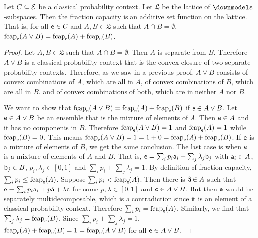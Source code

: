 	\begin{prop}
		Let $C \subseteq \Ens$ be a classical probability context. Let $\mathfrak{L}$ be the lattice of $\separate$-subspaces. Then the fraction capacity is an additive set function on the lattice. That is, for all $\ens \in C$ and $A, B \in \mathfrak{L}$ such that $A \cap B = \emptyset$,  $\fcap_{\ens}(A \vee B) = \fcap_{\ens}(A) + \fcap_{\ens}(B)$.
	\end{prop}
	
	\begin{proof}
		Let $A, B\in \mathfrak{L}$ such that $A \cap B = \emptyset$. Then $A$ is separate from $B$. Therefore $A \vee B$ is a classical probability context that is the convex closure of two separate probability contexts. Therefore, as we saw in a previous proof, $A \vee B$ consists of convex combinations of $A$, which are all in $A$, of convex combinations of $B$, which are all in $B$, and of convex combinations of both, which are in neither $A$ nor $B$.
		
		We want to show that $\fcap_{\ens}(A \vee B) = \fcap_{\ens}(A) + \fcap_{\ens}(B)$ if $\ens \in A \vee B$. Let $\ens \in A \vee B$ be an ensemble that is the mixture of elements of $A$. Then $\ens \in A$ and it has no components in $B$. Therefore $\fcap_{\ens}(A \vee B) = 1$ and $\fcap_{\ens}(A) = 1$ while $\fcap_{\ens}(B) = 0$. This means $\fcap_{\ens}(A \vee B) = 1 = 1 + 0 = \fcap_{\ens}(A) + \fcap_{\ens}(B)$. If $\ens$ is a mixture of elements of $B$, we get the same conclusion. The last case is when $\ens$ is a mixture of elements of $A$ and $B$. That is, $\ens = \sum_i p_i \ens[a]_i + \sum_j \lambda_j \ens[b]_j$ with $\ens[a]_i \in A$, $\ens[b]_j \in B$, $p_i, \lambda_j \in [0,1]$ and $\sum_i p_i + \sum_j \lambda_j = 1$. By definition of fraction capacity, $\sum_i p_i \leq \fcap_{\ens}(A)$. Suppose $\sum_i p_i < \fcap_{\ens}(A)$. Then there is $\hat{\ens[a]} \in A$ such that $\ens = \sum_i p_i \ens[a]_i + p \hat{\ens[a]} + \lambda \ens[c]$ for some $p,\lambda \in [0,1]$ and $\ens[c] \in A \vee B$. But then $\ens$ would be separately multidecomposable, which is a contradiction since it is an element of a classical probability context. Therefore $\sum_i p_i = \fcap_{\ens}(A)$. Similarly, we find that $\sum_j \lambda_j = \fcap_{\ens}(B)$. Since $\sum_i p_i + \sum_j \lambda_j = 1$, $\fcap_{\ens}(A) + \fcap_{\ens}(B) = 1 = \fcap_{\ens}(A \vee B)$ for all $\ens \in A \vee B$.
		

\end{proof}
